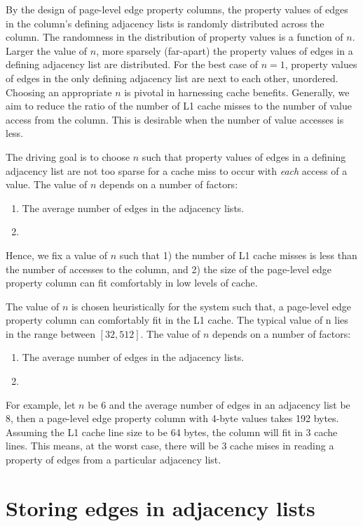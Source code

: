 By the design of page-level edge property columns, the property values of edges in the column's defining adjacency lists is randomly distributed across the column. The randomness in the distribution of property values is a function of $n$. Larger the value of $n$, more sparsely (far-apart) the property values of edges in a defining adjacency list are distributed. For the best case of $n=1$, property values of edges in the only defining adjacency list are next to each other, unordered. Choosing an appropriate $n$ is pivotal in harnessing cache benefits. Generally, we aim to reduce the ratio of the number of L1 cache misses to the number of value access from the column. This is desirable when the number of value accesses is less. 

The driving goal is to choose $n$ such that property values of edges in a defining adjacency list are not too sparse for a cache miss to occur with \emph{each} access of a value. The value of $n$ depends on a number of factors: 
\begin{enumerate}
	\item The average number of edges in the adjacency lists.
	\item  
\end{enumerate}

Hence, we fix a value of $n$ such that 1) the number of L1 cache misses is less than the number of accesses to the column, and 2) the size of the page-level edge property column can fit comfortably in low levels of cache.

The value of $n$ is chosen heuristically for the system such that, a page-level edge property column can comfortably fit in the L1 cache. The typical value of n lies in the range between $[32, 512]$. The value of $n$ depends on a number of factors: 
\begin{enumerate}
	\item The average number of edges in the adjacency lists.
	\item  
\end{enumerate} 


For example, let $n$ be 6 and the average number of edges in an adjacency list be 8, then a page-level edge property column with 4-byte values takes 192 bytes. Assuming the L1 cache line size to be 64 bytes, the column will fit in 3 cache lines. This means, at the worst case, there will be 3 cache mises in reading a property of edges from a particular adjacency list.

\section{Storing edges in adjacency lists}
\label{sec:adjacency-lists}

